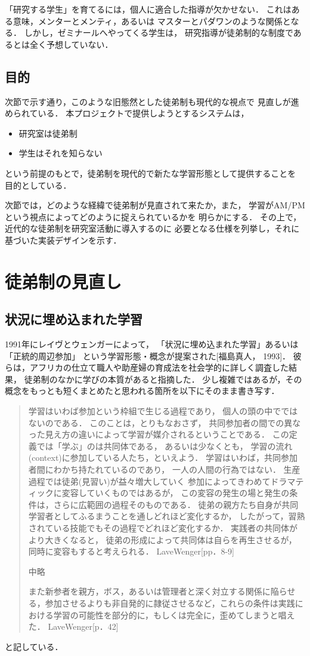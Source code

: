 \documentclass{hissymp}
\begin{document}
「研究する学生」を育てるには，個人に適合した指導が欠かせない．
これはある意味，メンターとメンティ，あるいは
マスターとパダワンのような関係となる．
しかし，ゼミナールへやってくる学生は，
研究指導が徒弟制的な制度であるとは全く予想していない．

\subsection{目的}
\label{sec:org2d9c1ea}
次節で示す通り，このような旧態然とした徒弟制も現代的な視点で
見直しが進められている．
本プロジェクトで提供しようとするシステムは，
\begin{itemize}
\item 研究室は徒弟制
\item 学生はそれを知らない
\end{itemize}
という前提のもとで，徒弟制を現代的で新たな学習形態として提供することを
目的としている．

次節では，どのような経緯で徒弟制が見直されて来たか，また，
学習がAM/PMという視点によってどのように捉えられているかを
明らかにする．
その上で，近代的な徒弟制を研究室活動に導入するのに
必要となる仕様を列挙し，それに基づいた実装デザインを示す．

\section{徒弟制の見直し}
\label{sec:org639b784}
\subsection{状況に埋め込まれた学習}
\label{sec:org831e7d9}
1991年にレイヴとウェンガーによって，
  「状況に埋め込まれた学習」あるいは「正統的周辺参加」
  という学習形態・概念が提案された[福島真人， 1993]．
  彼らは，アフリカの仕立て職人や助産婦の育成法を社会学的に詳しく調査した結果，
  徒弟制のなかに学びの本質があると指摘した．
少し複雑ではあるが，その概念をもっとも短くまとめたと思われる箇所を以下にそのまま書き写す．
\begin{quote}
学習はいわば参加という枠組で生じる過程であり，
個人の頭の中でではないのである．
このことは，とりもなおさず，
共同参加者の間での異なった見え方の違いによって学習が媒介されるということである．
この定義では「学ぶ」のは共同体である，
あるいは少なくとも，
学習の流れ(context)に参加している人たち，といえよう．
学習はいわば，共同参加者間にわかち持たれているのであり，
一人の人間の行為ではない．
生産過程では徒弟(見習い)が益々増大していく
参加によってきわめてドラマティックに変容していくものではあるが，
この変容の発生の場と発生の条件は，さらに広範囲の過程そのものである．
徒弟の親方たち自身が共同学習者としてふるまうことを通しどれほど変化するか，
したがって，習熟されている技能でもその過程でどれほど変化するか．
実践者の共同体がより大きくなると，
徒弟の形成によって共同体は自らを再生させるが，
同時に変容もすると考えられる．
LaveWenger[pp．8-9]

中略

また新参者を親方，ボス，あるいは管理者と深く対立する関係に陥らせる，参加させるよりも非自発的に隷従させるなど，これらの条件は実践における学習の可能性を部分的に，もしくは完全に，歪めてしまうと唱えた．
 LaveWenger[p．42]
\end{quote}
と記している．
\end{document}
